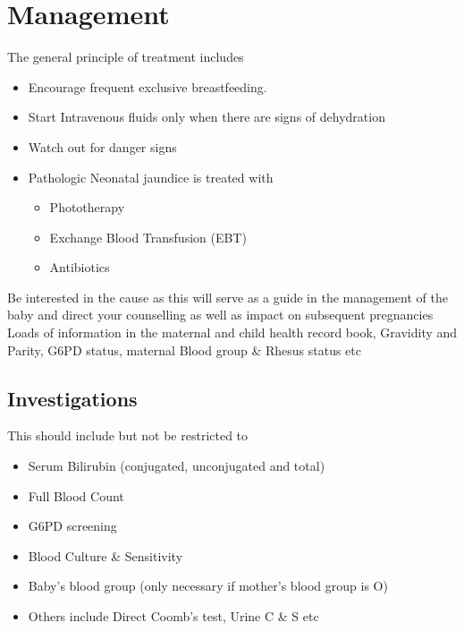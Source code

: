 \documentclass[
  letterpaper,
  DIV=11,
  numbers=noendperiod]{scrreprt}
\providecommand{\tightlist}{%
  \setlength{\itemsep}{0pt}\setlength{\parskip}{0pt}}\usepackage{longtable,booktabs,array}
\begin{document}
\hypertarget{management}{%
\section{Management}\label{management}}

The general principle of treatment includes

\begin{itemize}
\tightlist
\item
  Encourage frequent exclusive breastfeeding.
\item
  Start Intravenous fluids only when there are signs of dehydration
\item
  Watch out for danger signs
\item
  Pathologic Neonatal jaundice is treated with

  \begin{itemize}
  \tightlist
  \item
    Phototherapy
  \item
    Exchange Blood Transfusion (EBT)
  \item
    Antibiotics
  \end{itemize}
\end{itemize}

Be interested in the cause as this will serve as a guide in the
management of the baby and direct your counselling as well as impact on
subsequent pregnancies Loads of information in the maternal and child
health record book, Gravidity and Parity, G6PD status, maternal Blood
group \& Rhesus status etc

\hypertarget{investigations}{%
\subsection{Investigations}\label{investigations}}

This should include but not be restricted to

\begin{itemize}
\tightlist
\item
  Serum Bilirubin (conjugated, unconjugated and total)
\item
  Full Blood Count
\item
  G6PD screening
\item
  Blood Culture \& Sensitivity
\item
  Baby's blood group (only necessary if mother's blood group is O)
\item
  Others include Direct Coomb's test, Urine C \& S etc
\end{itemize}
\end{document}
